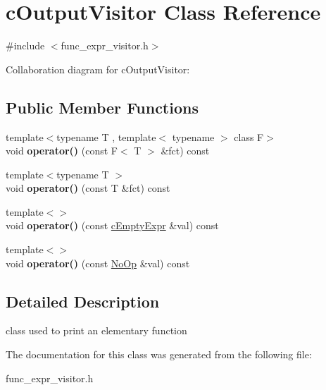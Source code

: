 \hypertarget{classcOutputVisitor}{\section{c\-Output\-Visitor Class Reference}
\label{classcOutputVisitor}
}


{\ttfamily \#include $<$func\-\_\-expr\-\_\-visitor.\-h$>$}



Collaboration diagram for c\-Output\-Visitor\-:
\subsection*{Public Member Functions}
\begin{DoxyCompactItemize}
\item 
\hypertarget{classcOutputVisitor_a96513d56b491ef22e4d662182add1142}{{\footnotesize template$<$typename T , template$<$ typename $>$ class F$>$ }\\void {\bfseries operator()} (const F$<$ T $>$ \&fct) const }\label{classcOutputVisitor_a96513d56b491ef22e4d662182add1142}

\item 
\hypertarget{classcOutputVisitor_a531e75ef7e5d0e92e4815934964d1bc8}{{\footnotesize template$<$typename T $>$ }\\void {\bfseries operator()} (const T \&fct) const }\label{classcOutputVisitor_a531e75ef7e5d0e92e4815934964d1bc8}

\item 
\hypertarget{classcOutputVisitor_abe29e2af99d60e7444f0b4a3ea71d5e4}{{\footnotesize template$<$$>$ }\\void {\bfseries operator()} (const \hyperlink{structcEmptyExpr}{c\-Empty\-Expr} \&val) const }\label{classcOutputVisitor_abe29e2af99d60e7444f0b4a3ea71d5e4}

\item 
\hypertarget{classcOutputVisitor_adfb1e4753092723e985718d24ed96ba6}{{\footnotesize template$<$$>$ }\\void {\bfseries operator()} (const \hyperlink{structNoOp}{No\-Op} \&val) const }\label{classcOutputVisitor_adfb1e4753092723e985718d24ed96ba6}

\end{DoxyCompactItemize}


\subsection{Detailed Description}
class used to print an elementary function 

The documentation for this class was generated from the following file\-:\begin{DoxyCompactItemize}
\item 
func\-\_\-expr\-\_\-visitor.\-h\end{DoxyCompactItemize}

